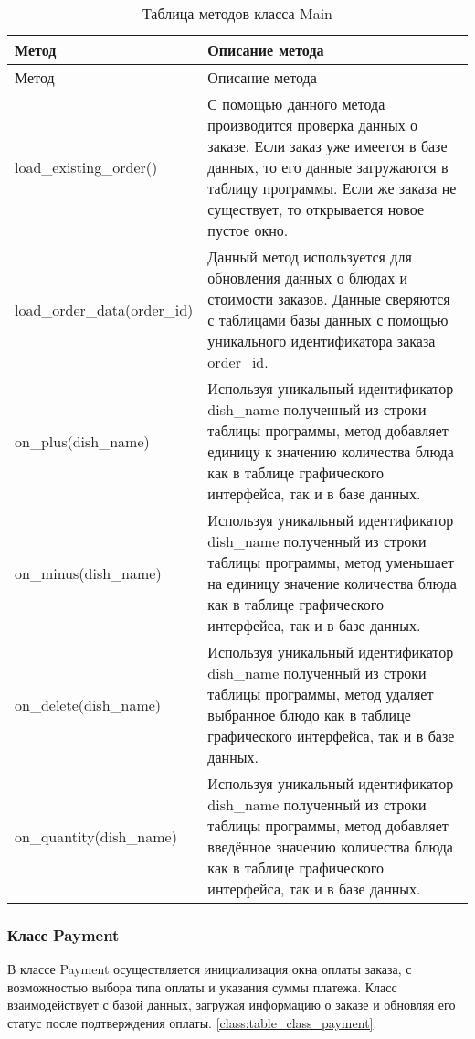 \begin{xltabular}{\textwidth}{|p{6cm}|X|}
	\caption{Таблица методов класса Main\label{class:table_class_main}} \hline
	\centrow Метод & \centrow Описание метода \\ \hline
	\endfirsthead
	\centrow Метод & \centrow Описание метода \\ \hline
	\finishhead
	load\_existing\_order() & С помощью данного метода производится проверка данных о заказе. Если заказ уже имеется в базе данных, то его данные загружаются в таблицу программы. Если же заказа не существует, то открывается новое пустое окно. \\ \hline 
	load\_order\_data(order\_id) & Данный метод используется для обновления данных о блюдах и стоимости заказов. Данные сверяются с таблицами базы данных с помощью уникального идентификатора заказа order\_id. \\ \hline 
	on\_plus(dish\_name) & Используя уникальный идентификатор dish\_name полученный из строки таблицы программы, метод добавляет единицу к значению количества блюда как в таблице графического интерфейса, так и в базе данных. \\ \hline  
	on\_minus(dish\_name) & Используя уникальный идентификатор dish\_name полученный из строки таблицы программы, метод уменьшает на единицу значение количества блюда как в таблице графического интерфейса, так и в базе данных. \\ \hline 
	on\_delete(dish\_name) & Используя уникальный идентификатор dish\_name полученный из строки таблицы программы, метод удаляет выбранное блюдо как в таблице графического интерфейса, так и в базе данных. \\ \hline 
	on\_quantity(dish\_name) & Используя уникальный идентификатор dish\_name полученный из строки таблицы программы, метод добавляет введённое значению количества блюда как в таблице графического интерфейса, так и в базе данных. 
	
\end{xltabular}




\subsubsection{Класс Payment}


В классе Payment осуществляется инициализация окна оплаты заказа, с возможностью выбора типа оплаты и указания суммы платежа. Класс взаимодействует с базой данных, загружая информацию о заказе и обновляя его статус после подтверждения оплаты.  \ref{class:table_class_payment}.

